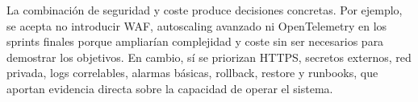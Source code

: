 La combinación de seguridad y coste produce decisiones concretas. Por ejemplo, se acepta no introducir WAF, autoscaling avanzado ni OpenTelemetry en los sprints finales porque ampliarían complejidad y coste sin ser necesarios para demostrar los objetivos. En cambio, sí se priorizan HTTPS, secretos externos, red privada, logs correlables, alarmas básicas, rollback, restore y runbooks, que aportan evidencia directa sobre la capacidad de operar el sistema.
